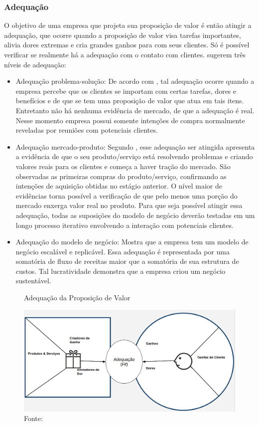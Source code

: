 \subsubsection{Adequação}
\label{cha:adequação}
O objetivo de uma empresa que projeta sua proposição de valor é então atingir a adequação, que ocorre quando a proposição de valor visa tarefas importantes, alivia dores extremas e cria grandes ganhos para com seus clientes. Só é possível verificar se realmente há a adequação com o contato com clientes.  sugerem três níveis de adequação:
\begin{itemize}
\item Adequação problema-solução: De acordo com , tal adequação ocorre quando a empresa percebe que os clientes se importam com certas tarefas, dores e benefícios e de que se tem uma proposição de valor que atua em tais itens. Entretanto não há nenhuma evidência de mercado, de que a adequação é real. Nesse momento empresa possui somente intenções de compra normalmente reveladas por reuniões com potenciais clientes.
\item Adequação mercado-produto: Segundo , esse adequação ser atingida apresenta a evidência de que o seu produto/serviço está resolvendo problemas e criando valores reais para os clientes e começa a haver tração do mercado. São observadas as primeiras compras do produto/serviço, confirmando as intenções de aquisição obtidas no estágio anterior. O nível maior de evidências torna possível a verificação de que pelo menos uma porção do mercado enxerga valor real no produto. Para que seja possível atingir essa adequação, todas as suposições do modelo de negócio deverão testadas em um longo processo iterativo envolvendo a interação com potenciais clientes.
\item Adequação do modelo de negócio: Mostra que a empresa tem um modelo de negócio escalável e replicável. Essa adequação é representada por uma somatória de fluxo de receitas maior que a somatória de sua estrutura de custos. Tal lucratividade demonstra que a empresa criou um negócio sustentável. \cite{valueproposition}
\end{itemize}

\begin{figure}[H]
\caption{Adequação da Proposição de Valor}
\centerline{\includegraphics[scale=0.25]{img/value_proposition_fit}}
\label{fig:value_proposition_fit}
\caption* {Fonte: }
\end{figure}

